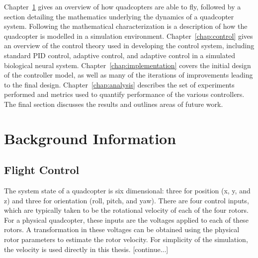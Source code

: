 \documentclass[letterpaper,12pt,titlepage,oneside,final]{book}
\newcommand{\Chapref}[1]{Chapter~\ref{#1}}
\begin{document}
\Chapref{chap:background} gives an overview of how quadcopters are able to fly, followed by a section detailing the mathematics underlying the dynamics of a quadcopter system. 
Following the mathematical characterization is a description of how the quadcopter is modelled in a simulation environment.
\Chapref{chap:control} gives an overview of the control theory used in developing the control system, including standard PID control, adaptive control, and adaptive control in a simulated biological neural system. 
\Chapref{chap:implementation} covers the initial design of the controller model, as well as many of the iterations of improvements leading to the final design.
\Chapref{chap:analysis} describes the set of experiments performed and metrics used to quantify performance of the various controllers. 
The final section discusses the results and outlines areas of future work.

\chapter{Background Information} \label{chap:background}

\section{Flight Control}


The system state of a quadcopter is six dimensional: three for position (x, y, and z) and three for orientation (roll, pitch, and yaw). 
There are four control inputs, which are typically taken to be the rotational velocity of each of the four rotors. 
For a physical quadcopter, these inputs are the voltages applied to each of these rotors.
A transformation in these voltages can be obtained using the physical rotor parameters to estimate the rotor velocity.
For simplicity of the simulation, the velocity is used directly in this thesis. [continue...]
\end{document}
